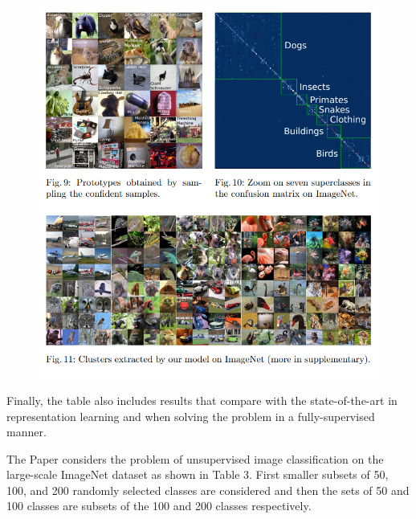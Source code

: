 \begin{figure}[hbt!]
\begin{center}
\includegraphics[width=6in]{7.PNG}
\end{center}
\end{figure}
Finally, the table also includes results that compare with the state-of-the-art in representation learning and when solving the problem in a fully-supervised manner. 


\FloatBarrier


\medskip

The Paper considers the problem of unsupervised image classification on the large-scale ImageNet dataset as shown in Table 3. First smaller subsets of 50, 100, and 200 randomly selected classes are considered and then the sets of 50 and 100 classes are subsets of the 100 and 200 classes respectively. 


